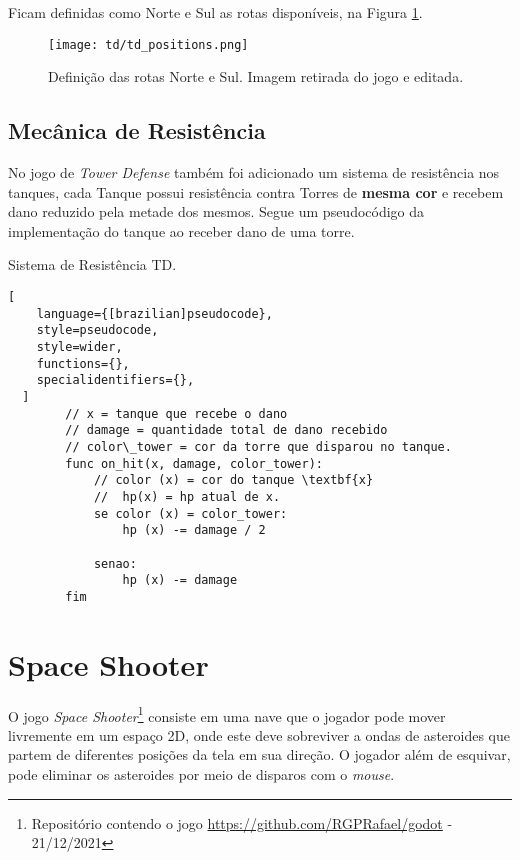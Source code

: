 Ficam definidas como Norte e Sul as rotas disponíveis, na Figura \ref{fig:td-rota}.

\begin{figure}
  \centering
  \texttt{[image: td/td\_positions.png]}
  \caption{Definição das rotas Norte e Sul. Imagem retirada do jogo e editada.\label{fig:td-rota}}
\end{figure}

\subsection{Mecânica de Resistência}
\label{sub-sec:mecanica-de-resistencia}

No jogo de \textit{Tower Defense} também foi adicionado um sistema de resistência nos tanques, cada Tanque possui resistência contra Torres de \textbf{mesma cor} e recebem dano reduzido pela metade dos mesmos. Segue um pseudocódigo da implementação do tanque ao receber dano de uma torre.

\begin{programruledcaption}{Sistema de Resistência TD.\label{prog:resistencia-TD}}
  \begin{lstlisting}[
    language={[brazilian]pseudocode},
    style=pseudocode,
    style=wider,
    functions={},
    specialidentifiers={},
  ]
        // x = tanque que recebe o dano
        // damage = quantidade total de dano recebido
        // color\_tower = cor da torre que disparou no tanque.
        func on_hit(x, damage, color_tower):
            // color (x) = cor do tanque \textbf{x}
            //  hp(x) = hp atual de x.
	        se color (x) = color_tower:
		        hp (x) -= damage / 2
		
        	senao:
        		hp (x) -= damage
        fim
  \end{lstlisting}
\end{programruledcaption}


\newpage
\section{Space Shooter}
\label{sec:mj-ss}

O jogo \textit{Space Shooter}\footnote{Repositório contendo o jogo { \url{https://github.com/RGPRafael/godot} - 21/12/2021}} consiste em uma nave que o jogador pode mover livremente em um espaço 2D, onde este deve sobreviver a ondas de asteroides que partem de diferentes posições da tela em sua direção. O jogador além de esquivar, pode eliminar os asteroides por meio de disparos com o \textit{mouse}. 

